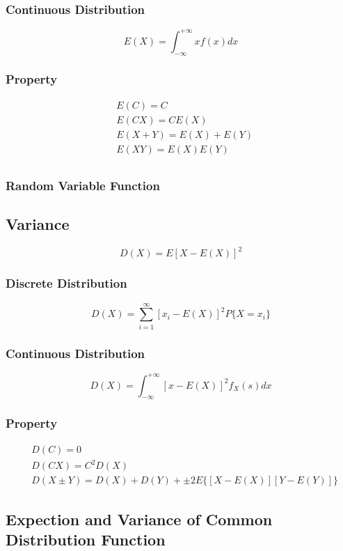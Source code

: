 \documentclass{ctexart}
\begin{document}
\subsubsection{Continuous Distribution}
\[E(X)=\int^{+\infty}_{-\infty}xf(x)dx\]

\subsubsection{Property}
\begin{align*}
&E(C)=C \\
&E(CX)=CE(X) \\
&E(X+Y)=E(X)+E(Y) \\
&E(XY)=E(X)E(Y)  \\
\end{align*}


\subsubsection{Random Variable Function}


\subsection{Variance}
\[D(X)=E[X-E(X)]^2\]
\subsubsection{Discrete Distribution}
\[D(X)=\sum^{\infty}_{i=1}[x_i-E(X)]^2P\{X=x_i\}\]
\subsubsection{Continuous Distribution}
\[D(X)=\int^{+\infty}_{-\infty}[x-E(X)]^2f_X(s)dx\]

\subsubsection{Property}
\begin{align*}
&D(C)=0 \\
&D(CX)=C^2D(X) \\
&D(X\pm Y)=D(X)+D(Y)+\pm 2E\{[X-E(X)][Y-E(Y)]\}
\end{align*}

\vspace{12 pt}
\subsection{Expection and Variance of Common Distribution Function}
\end{document}

